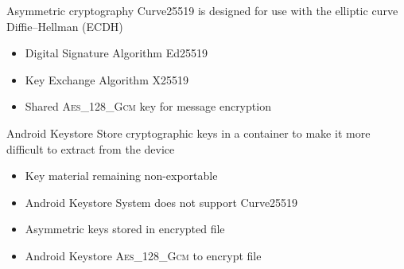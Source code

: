 \documentclass[aspectratio=169]{beamer}
\begin{document}
  \begin{frame}{Asymmetric cryptography}
    Curve25519 is designed for use with the elliptic curve Diffie–Hellman (ECDH)
    \begin{itemize}
      \item Digital Signature Algorithm Ed25519
      \item Key Exchange Algorithm X25519
      \item Shared \textsc{Aes\_128\_Gcm} key for message encryption
    \end{itemize}
  \end{frame}

  \begin{frame}{Android Keystore}
    Store cryptographic keys in a container to make it more difficult to extract from the device
    \begin{itemize}
      \item Key material remaining non-exportable
      \item Android Keystore System does not support Curve25519
      \item Asymmetric keys stored in encrypted file
      \item Android Keystore \textsc{Aes\_128\_Gcm} to encrypt file
    \end{itemize}
  \end{frame}

  \maketitle
%    
%    
\end{document}
